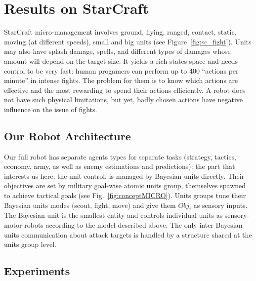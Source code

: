 \section{Results on StarCraft}
StarCraft micro-management involves ground, flying, ranged, contact, static, moving (at different speeds), small and big units (see Figure~\ref{fig:sc_fight}). Units may also have splash damage, spells, and different types of damages whose amount will depend on the target size. It yields a rich states space and needs control to be very fast: human progamers can perform up to 400 ``actions per minute'' in intense fights. The problem for them is to know which actions are effective and the most rewarding to spend their actions efficiently. A robot does not have such physical limitations, but yet, badly chosen actions have negative influence on the issue of fights. %

\subsection{Our Robot Architecture}

Our full robot has separate agents types for separate tasks (strategy, tactics, economy, army, as well as enemy estimations and predictions): the part that interests us here, the unit control, is managed by Bayesian units directly. Their objectives are set by military goal-wise atomic units group, themselves spawned to achieve tactical goals (see Fig.~\ref{fig:conceptMICRO}). Units groups tune their Bayesian units modes (scout, fight, move) and give them $Obj_i$ as sensory inputs. The Bayesian unit is the smallest entity and controls individual units as sensory-motor robots according to the model described above. The only inter Bayesian units communication about attack targets is handled by a structure shared at the units group level.

\subsection{Experiments}

